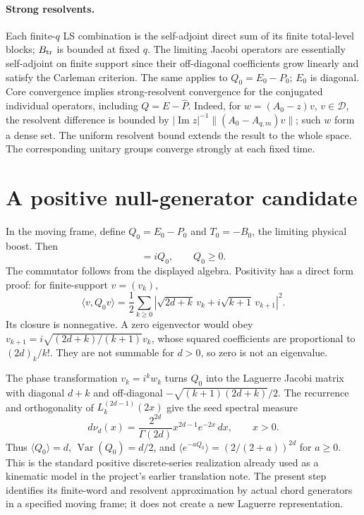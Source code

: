 \documentclass[11pt]{article}
\newcommand{\PP}{\widehat P}
\newcommand{\Bt}{B_{\rm tr}}
\newcommand{\D}{\mathcal D}
\begin{document}
\paragraph{Strong resolvents.}
Each finite-$q$ LS combination is the self-adjoint direct sum
of its finite total-level blocks; $\Bt$ is bounded at fixed $q$.
The limiting Jacobi operators are essentially self-adjoint on
finite support since their off-diagonal coefficients grow
linearly and satisfy the Carleman criterion. The same applies
to $Q_0=E_0-P_0$; $E_0$ is diagonal.
Core convergence implies strong-resolvent convergence for
the conjugated individual operators, including $Q=E-\PP$.
Indeed, for $w=(A_0-z)v$, $v\in\D$, the resolvent difference
is bounded by $|\operatorname{Im}z|^{-1}\|(A_0-A_{q,m})v\|$;
such $w$ form a dense set. The uniform resolvent bound extends
the result to the whole space. The corresponding unitary groups
converge strongly at each fixed time.

\newpage
\section{A positive null-generator candidate}
In the moving frame, define $Q_0=E_0-P_0$ and
$T_0=-B_0$, the limiting physical boost. Then
\begin{equation}
 [T_0,Q_0]=iQ_0,\qquad Q_0\ge0.\label{null}
\end{equation}
The commutator follows from the displayed algebra. Positivity
has a direct form proof: for finite-support $v=(v_k)$,
\begin{equation}
 \langle v,Q_0v\rangle=
 \frac12\sum_{k\ge0}
 \left|\sqrt{2d+k}\,v_k+i\sqrt{k+1}\,v_{k+1}\right|^2.
 \label{positive}
\end{equation}
Its closure is nonnegative. A zero eigenvector would obey
$v_{k+1}=i\sqrt{(2d+k)/(k+1)}v_k$, whose squared coefficients
are proportional to $(2d)_k/k!$. They are not summable for
$d>0$, so zero is not an eigenvalue.

The phase transformation $v_k=i^kw_k$ turns $Q_0$ into the
Laguerre Jacobi matrix with diagonal $d+k$ and off-diagonal
$-\sqrt{(k+1)(2d+k)}/2$. The recurrence and orthogonality of
$L_k^{(2d-1)}(2x)$ \cite{DLMF} give the seed spectral measure
\begin{equation}
 d\nu_d(x)=\frac{2^{2d}}{\Gamma(2d)}x^{2d-1}e^{-2x}\,dx,
 \qquad x>0.\label{gamma}
\end{equation}
Thus $\langle Q_0\rangle=d$, $\operatorname{Var}(Q_0)=d/2$,
and $\langle e^{-aQ_0}\rangle=(2/(2+a))^{2d}$ for $a\ge0$.
This is the standard positive discrete-series realization already
used as a kinematic model in the project's earlier translation
note. The present step identifies its finite-word and resolvent
approximation by actual chord generators in a specified moving
frame; it does not create a new Laguerre representation.
\end{document}
